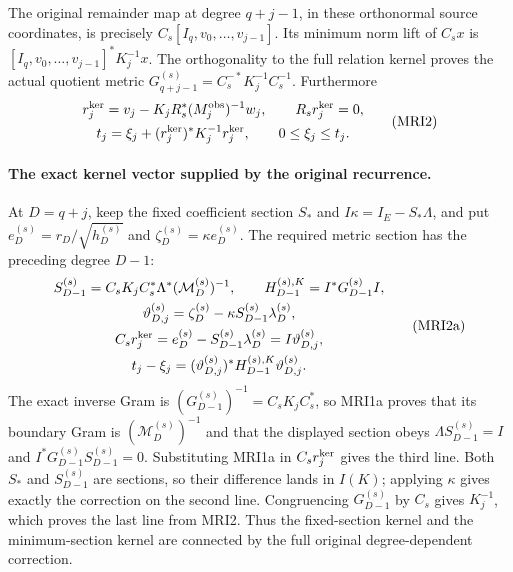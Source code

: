 \documentclass[11pt,a4paper]{article}
\begin{document}
The original remainder map at degree $q+j-1$, in these orthonormal
source coordinates, is precisely
$C_s[I_q,v_0,\ldots,v_{j-1}]$. Its minimum norm lift of $C_sx$
is $[I_q,v_0,\ldots,v_{j-1}]^*K_j^{-1}x$. The orthogonality to
the full relation kernel proves the actual quotient metric
$G_{q+j-1}^{(s)}=C_s^{-*}K_j^{-1}C_s^{-1}$.
Furthermore
\[
\begin{gathered}
 r_j^{\rm ker}=v_j-K_jR_s^*(M_j^{\rm obs})^{-1}w_j,
 \qquad R_sr_j^{\rm ker}=0,\\
 t_j=\xi_j+(r_j^{\rm ker})^*K_j^{-1}r_j^{\rm ker},
 \qquad0\le\xi_j\le t_j.
\end{gathered}\tag{MRI2}
\]

\paragraph{The exact kernel vector supplied by the original recurrence.}
At $D=q+j$, keep the fixed coefficient section $S_*$ and
$I\kappa=I_E-S_*\Lambda$, and put
$e_D^{(s)}=r_D/\sqrt{h_D^{(s)}}$ and
$\zeta_D^{(s)}=\kappa e_D^{(s)}$. The required metric section
has the preceding degree $D-1$:
\[
\begin{gathered}
 S_{D-1}^{(s)}=C_sK_jC_s^*\Lambda^*
                          (\mathcal M_D^{(s)})^{-1},\qquad
 H_{D-1}^{(s),K}=I^*G_{D-1}^{(s)}I,\\
 \vartheta_{D,j}^{(s)}
       =\zeta_D^{(s)}-\kappa S_{D-1}^{(s)}\lambda_D^{(s)},\\
 C_sr_j^{\rm ker}
       =e_D^{(s)}-S_{D-1}^{(s)}\lambda_D^{(s)}
       =I\vartheta_{D,j}^{(s)},\\
 t_j-\xi_j=(\vartheta_{D,j}^{(s)})^*
                     H_{D-1}^{(s),K}\vartheta_{D,j}^{(s)}.
\end{gathered}\tag{MRI2a}
\]
The exact inverse Gram is
$(G_{D-1}^{(s)})^{-1}=C_sK_jC_s^*$, so MRI1a proves that
its boundary Gram is $(\mathcal M_D^{(s)})^{-1}$ and that
the displayed section obeys $\Lambda S_{D-1}^{(s)}=I$ and
$I^*G_{D-1}^{(s)}S_{D-1}^{(s)}=0$. Substituting MRI1a in
$C_sr_j^{\rm ker}$ gives the third line. Both $S_*$ and
$S_{D-1}^{(s)}$ are sections, so their difference lands in
$I(K)$; applying $\kappa$ gives exactly the correction on
the second line. Congruencing $G_{D-1}^{(s)}$ by $C_s$ gives
$K_j^{-1}$, which proves the last line from MRI2. Thus the
fixed-section kernel and the minimum-section kernel are connected
by the full original degree-dependent correction.
\end{document}

